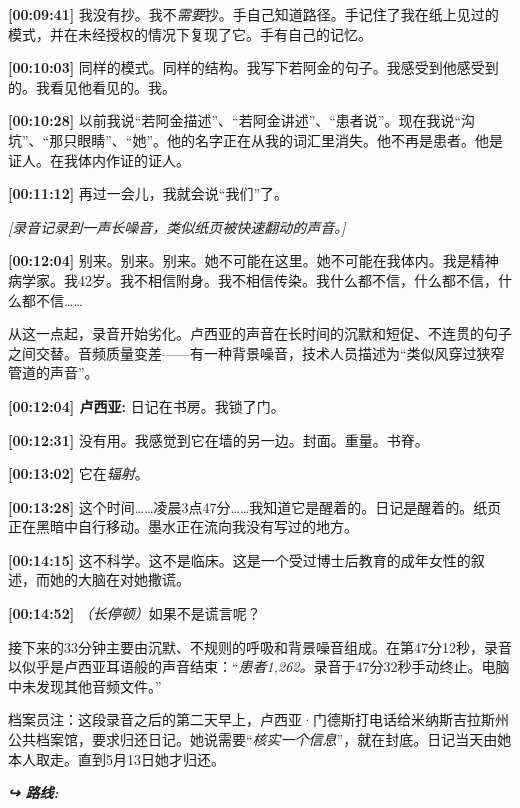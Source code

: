 \noindent \textbf{[00:09:41]} 我没有抄。我不\textit{需要}抄。手自己知道路径。手记住了我在纸上见过的模式，并在未经授权的情况下复现了它。手有自己的记忆。

\noindent \textbf{[00:10:03]} 同样的模式。同样的结构。我写下若阿金的句子。我感受到他感受到的。我看见他看见的。我。

\noindent \textbf{[00:10:28]} 以前我说\textquotedblleft{}若阿金描述\textquotedblright{}、\textquotedblleft{}若阿金讲述\textquotedblright{}、\textquotedblleft{}患者说\textquotedblright{}。现在我说\textquotedblleft{}沟坑\textquotedblright{}、\textquotedblleft{}那只眼睛\textquotedblright{}、\textquotedblleft{}她\textquotedblright{}。他的名字正在从我的词汇里消失。他不再是患者。他是证人。在我体内作证的证人。

\noindent \textbf{[00:11:12]} 再过一会儿，我就会说\textquotedblleft{}我们\textquotedblright{}了。

\noindent \textit{[录音记录到一声长噪音，类似纸页被快速翻动的声音。]}

\noindent \textbf{[00:12:04]} 别来。别来。别来。她不可能在这里。她不可能在我体内。我是精神病学家。我42岁。我不相信附身。我不相信传染。我什么都不信，什么都不信，什么都不信……

\noindent 从这一点起，录音开始劣化。卢西亚的声音在长时间的沉默和短促、不连贯的句子之间交替。音频质量变差——有一种背景噪音，技术人员描述为“类似风穿过狭窄管道的声音”。

\noindent \textbf{[00:12:04] 卢西亚:} 日记在书房。我锁了门。

\noindent \textbf{[00:12:31]} 没有用。我感觉到它在墙的另一边。封面。重量。书脊。

\noindent \textbf{[00:13:02]} 它在\textit{辐射}。

\noindent \textbf{[00:13:28]} 这个时间……凌晨3点47分……我知道它是醒着的。日记是醒着的。纸页正在黑暗中自行移动。墨水正在流向我没有写过的地方。

\noindent \textbf{[00:14:15]} 这不科学。这不是临床。这是一个受过博士后教育的成年女性的叙述，而她的大脑在对她撒谎。

\noindent \textbf{[00:14:52]} \textit{（长停顿）}如果不是谎言呢？

\noindent 接下来的33分钟主要由沉默、不规则的呼吸和背景噪音组成。在第47分12秒，录音以似乎是卢西亚耳语般的声音结束：\textquotedblleft{\textit{患者1,262。}录音于47分32秒手动终止。电脑中未发现其他音频文件。\textquotedblright{}}

\noindent 档案员注：这段录音之后的第二天早上，卢西亚·门德斯打电话给米纳斯吉拉斯州公共档案馆，要求归还日记。她说需要\textquotedblleft{\textit{核实一个信息}\textquotedblright{}}，就在封底。日记当天由她本人取走。直到5月13日她才归还。

\vspace{0.5em}
\noindent\textit{\textbf{↪ 路线:}  \rotasep {} \rotasep {} \rotasep {}}
